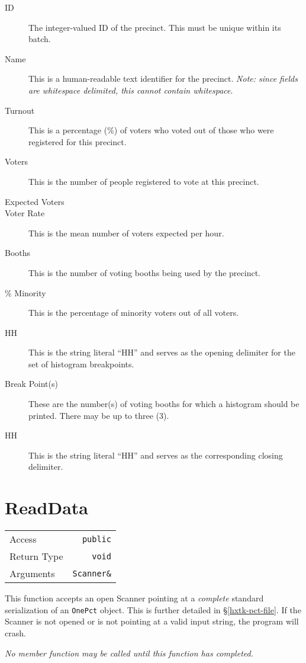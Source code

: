 \begin{description}
\item[ID] The integer-valued ID of the precinct. This must be unique within its batch.
\item[Name] This is a human-readable text identifier for the precinct. \emph{Note: since fields are whitespace delimited, this cannot contain whitespace}.
\item[Turnout] This is a percentage (\%) of voters who voted out of those who were registered for this precinct.
\item[Voters] This is the number of people registered to vote at this precinct.
\item[Expected Voters]
\item[Voter Rate] This is the mean number of voters expected per hour.
\item[Booths] This is the number of voting booths being used by the precinct.
\item[\% Minority] This is the percentage of minority voters out of all voters.
\item[HH] This is the string literal ``HH'' and serves as the opening delimiter for the set of histogram breakpoints.
\item[Break Point(s)] These are the number(s) of voting booths for which a histogram should be printed. There may be up to three (3).
\item[HH] This is the string literal ``HH'' and serves as the corresponding closing delimiter.
\end{description}

\section{ReadData}

\begin{center}
\begin{tabular}{l r}
Access & \texttt{public} \\
Return Type & \texttt{void} \\
Arguments & \texttt{Scanner\&}
\end{tabular}
\end{center}

This function accepts an open Scanner pointing at a \emph{complete} standard serialization of an \texttt{OnePct} object. This is further detailed in \S\ref{hxtk-pct-file}. If the Scanner is not opened or is not pointing at a valid input string, the program will crash.

\emph{No member function may be called until this function has completed.}

